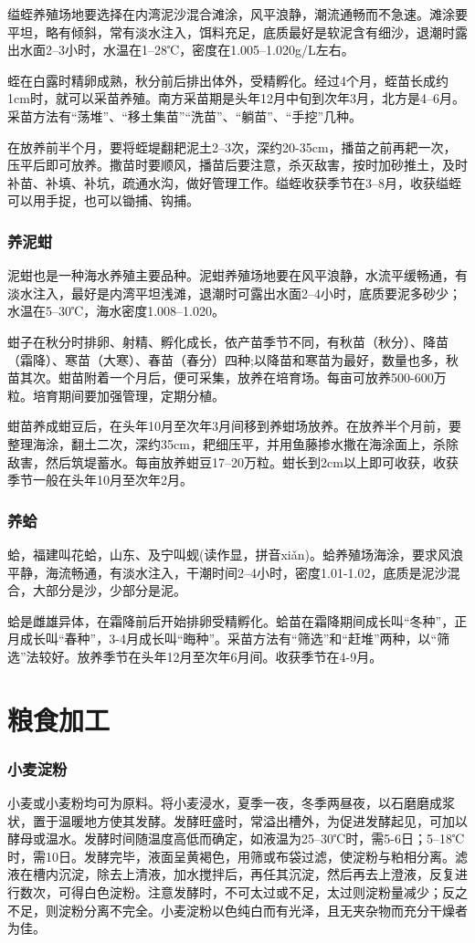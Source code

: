 \documentclass{ctexbook}
\begin{document}
缢蛭养殖场地要选择在内湾泥沙混合滩涂，风平浪静，潮流通畅而不急速。滩涂要平坦，略有倾斜，常有淡水注入，饵料充足，底质最好是软泥含有细沙，退潮时露出水面2--3小时，水温在1--28℃，密度在1.005--1.020g/L左右。

蛭在白露时精卵成熟，秋分前后排出体外，受精孵化。经过4个月，蛭苗长成约1cm时，就可以采苗养殖。南方采苗期是头年12月中旬到次年3月，北方是4--6月。采苗方法有“荡堆”、“移土集苗”“洗苗”、“躺苗”、“手挖”几种。

在放养前半个月，要将蛭堤翻耙泥土2--3次，深约20-35cm，播苗之前再耙一次，压平后即可放养。撒苗时要顺风，播苗后要注意，杀灭敌害，按时加砂推土，及时补苗、补填、补坑，疏通水沟，做好管理工作。缢蛭收获季节在3--8月，收获缢蛭可以用手捉，也可以锄捕、钩捕。
\subsection{养泥蚶}
泥蚶也是一种海水养殖主要品种。泥蚶养殖场地要在风平浪静，水流平缓畅通，有淡水注入，最好是内湾平坦浅滩，退潮时可露出水面2--4小时，底质要泥多砂少；水温在5--30℃，海水密度1.008--1.020。

蚶子在秋分时排卵、射精、孵化成长，依产苗季节不同，有秋苗（秋分）、降苗（霜降）、寒苗（大寒）、春苗（春分）四种;以降苗和寒苗为最好，数量也多，秋苗其次。蚶苗附着一个月后，便可采集，放养在培育场。每亩可放养500-600万粒。培育期间要加强管理，定期分植。

蚶苗养成蚶豆后，在头年10月至次年3月间移到养蚶场放养。在放养半个月前，要整理海涂，翻土二次，深约35cm，耙细压平，并用鱼藤掺水撒在海涂面上，杀除敌害，然后筑堤蓄水。每亩放养蚶豆17--20万粒。蚶长到2cm以上即可收获，收获季节一般在头年10月至次年2月。
\subsection{养蛤}
蛤，福建叫花蛤，山东、及宁叫蚬(读作显，拼音xiǎn)。蛤养殖场海涂，要求风浪平静，海流畅通，有淡水注入，干潮时间2--4小时，密度1.01-1.02，底质是泥沙混合，大部分是沙，少部分是泥。

蛤是雌雄异体，在霜降前后开始排卵受精孵化。蛤苗在霜降期间成长叫“冬种”，正月成长叫“春种”，3-4月成长叫“晦种”。采苗方法有“筛选”和“赶堆”两种，以“筛选”法较好。放养季节在头年12月至次年6月间。收获季节在4-9月。
\chapter{粮食加工}
\subsection{小麦淀粉}
小麦或小麦粉均可为原料。将小麦浸水，夏季一夜，冬季两昼夜，以石磨磨成浆状，置于温暖地方使其发酵。发酵旺盛时，常溢出槽外，为促进发酵起见，可加以酵母或温水。发酵时间随温度高低而确定，如液温为25--30℃时，需5-6日；5--18℃时，需10日。发酵完毕，液面呈黄褐色，用筛或布袋过滤，使淀粉与粕相分离。滤液在槽内沉淀，除去上清液，加水搅拌后，再任其沉淀，然后再去上澄液，反复进行数次，可得白色淀粉。注意发酵时，不可太过或不足，太过则淀粉量减少；反之不足，则淀粉分离不完全。小麦淀粉以色纯白而有光泽，且无夹杂物而充分干燥者为佳。
\end{document}
